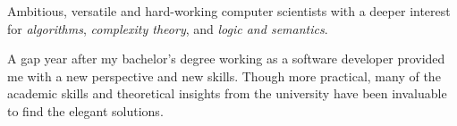 Ambitious, versatile and hard-working computer scientists with a deeper interest
for \emph{algorithms}, \emph{complexity theory}, and \emph{logic and semantics}.

\medskip

A gap year after my bachelor's degree working as a software developer provided
me with a new perspective and new skills. Though more practical, many of the
academic skills and theoretical insights from the university have been
invaluable to find the elegant solutions.
